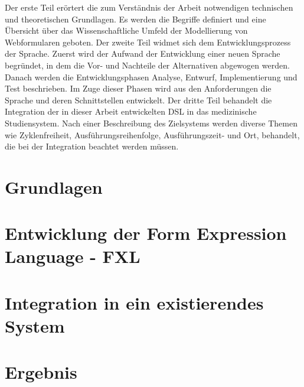 \documentclass [11pt,smallheadings, a4paper]{report}
\begin{document}
Der erste Teil erörtert die zum Verständnis der Arbeit notwendigen technischen und theoretischen Grundlagen. Es werden die Begriffe definiert und eine Über\-sicht über das Wissenschaftliche Umfeld der Modellierung von Webformularen geboten.
Der zweite Teil widmet sich dem Entwicklungsprozess der Sprache. Zuerst wird der Aufwand der Entwicklung einer neuen Sprache begründet, in dem die Vor- und Nachteile der Alternativen abgewogen werden. Danach werden die Entwicklungsphasen Analyse, Entwurf, Implementierung und Test beschrieben. Im Zuge dieser Phasen wird aus den Anforderungen die Sprache und deren Schnittstellen entwickelt.
Der dritte Teil behandelt die Integration der in dieser Arbeit entwickelten DSL in das medizinische Studiensystem. Nach einer Beschreibung des Zielsystems werden diverse Themen wie Zyklenfreiheit, Ausführungsreihenfolge, Ausführungszeit- und Ort, behandelt, die bei der Integration beachtet werden müssen.







\part{Grundlagen}
\label{part_grundlagen}


\part{Entwicklung der Form Expression Language - FXL}
\label{part_entwicklung}


\part{Integration in ein existierendes System}
\label{part_integration}


\part{Ergebnis}
\label{part_ergebnis}




%



\begin{flushleft}


\end{flushleft}


\listoftables
\listoffigures
\lstlistoflistings

\appendix

\end{document}
